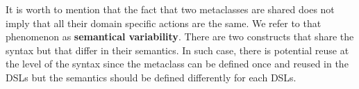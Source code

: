 It is worth to mention that the fact that two metaclasses are shared does not imply that all their domain specific actions are the same. We refer to that phenomenon as \textbf{semantical variability}. There are two constructs that share the syntax but that differ in their semantics. In such case, there is potential reuse at the level of the syntax since the metaclass can be defined once and reused in the DSLs but the semantics should be defined differently for each DSLs. 








